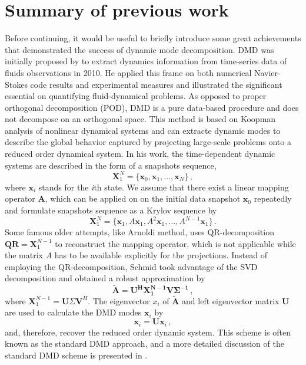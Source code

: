 \section{Summary of previous work}
Before continuing, it would be useful to briefly introduce some great achievements that demonstrated the success of dynamic mode decomposition.
DMD was initially proposed by \citet{schmid_dynamic_2010}\cite{schmid_applications_2011} to extract dynamics information from time-series data of fluids observations in 2010.
He applied this frame on both numerical Navier-Stokes code results and experimental measures and illustrated the significant essential on quantifying fluid-dynamical problems.
As opposed to proper orthogonal decomposition (POD)\cite{lumley2007stochastic}, DMD is a pure data-based procedure and does not decompose on an orthogonal space. 
This method is based on Koopman analysis of nonlinear dynamical systems and can extracte dynamic modes to describe the global behavior captured by projecting large-scale problems onto a reduced order dynamical system.
In his work, the time-dependent dynamic systems are described in the form of a snapshots sequence,
\begin{equation}
 \mathbf{X}^{N}_1 = \{\mathbf{x}_0, \mathbf{x}_1, \ldots, \mathbf{x}_{N} \} \, ,
 \label{eq:snap_matrix}
\end{equation}
where $\mathbf{x}_i$ stands for the {\it i}th state.
We assume that there exist a linear mapping operator $\mathbf{A}$, which can be applied on on the initial data snapshot $\mathbf{x}_0$ repeatedly and formulate snapshots sequence  as a Krylov sequence by
\begin{equation}
 \mathbf{X}^{N}_1 = \{\mathbf{x}_1,A\mathbf{x}_1,A^2\mathbf{x}_1,…,A^{N-1}\mathbf{x}_1 \} \, .
 \label{eq:Krylov_seq}
\end{equation}
Some famous older attempts, like Arnoldi method\cite{arnoldi1951principle}, uses QR-decomposition $\mathbf{QR} = \mathbf{X}^{N-1}_1$ to reconstruct the mapping operator, which is not applicable while the matrix $A$ has to be available explicitly for the projections.\cite{Greenbaum_1997}  \cite{trefethen1997numerical}
Instead of employing the QR-decomposition, Schmid took advantage of the SVD decomposition and obtained a robust approximation by 
\begin{equation}
\mathbf{\tilde{A}} = \mathbf{U^H X_1^{N-1}V\Sigma^{-1}} \, ,
 \label{eq:stanard_DMD}
\end{equation}
where $\mathbf{X}_1^{N-1} = \mathbf{U}\Sigma \mathbf{V}^H$. 
The eigenvector $x_i$ of $\mathbf{\tilde{A}}$ and left eigenvector matrix $\mathbf{U}$ are used to calculate the DMD modes $\mathbf{\mathbf{x}}_i$ by 
\begin{equation}
\mathbf{\mathbf{x}}_i = \mathbf{U} \mathbf{x}_i \, ,
 \label{eq:dyanmic_modes}
\end{equation}
and, therefore, recover the reduced order dynamic system.
This scheme is often known as the standard DMD approach, and a more detailed discussion of the standard DMD scheme is presented in .   

